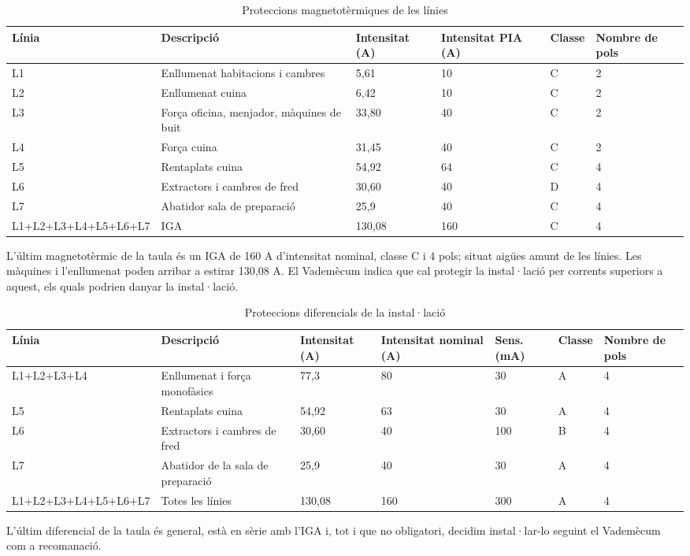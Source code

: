 \begin{table}[H]
\small
\begin{center}
 \begin{tabu} to \textwidth {|X[3, l]|X[2, l]|X[r]|X[r]|X[r]|X[r]|}%
 \hline
 Línia & Descripció & Intensitat (A) & Intensitat PIA (A) & Classe & Nombre de pols \\
 \hline \hline 
L1 & Enllumenat habitacions i cambres & 5,61 & 10 & C & 2 \\ \hline
L2 & Enllumenat cuina & 6,42 & 10 & C & 2 \\ \hline
L3 & Força oficina, menjador, màquines de buit & 33,80 & 40 & C & 2 \\ \hline
L4 & Força cuina & 31,45 & 40 & C & 2 \\ \hline
L5 & Rentaplats cuina & 54,92 & 64 & C & 4 \\ \hline
L6 & Extractors i cambres de fred & 30,60 & 40 & D & 4 \\ \hline
L7 & Abatidor sala de preparació & 25,9 & 40 & C & 4 \\ \hline \hline
L1+L2+L3+L4+L5+L6+L7 & IGA & 130,08 & 160 & C & 4 \\ \hline

 \end{tabu}
 \caption{Proteccions magnetotèrmiques de les línies}
\end{center}
\end{table}
\noindent L'últim magnetotèrmic de la taula és un IGA de 160 A d'intensitat nominal, classe C i 4 pols; situat aigües amunt de les línies. Les màquines i l'enllumenat poden arribar a estirar 130,08 A. El Vademècum indica que cal protegir la instal·lació per corrents superiors a aquest, els quals podrien danyar la instal·lació.


\begin{table}[H]
\small
\begin{center}
 \begin{tabu} to \textwidth {|X[3, l]|X[2, l]|X[r]|X[r]|X[1,r]|X[1,r]|X[r]|}%
 \hline
 Línia & Descripció & Intensitat (A) & Intensitat nominal (A) & Sens. (mA) & Classe & Nombre de pols \\
 \hline \hline 
L1+L2+L3+L4 & Enllumenat i força monofàsics & 77,3 & 80 & 30 & A & 4 \\ \hline
L5 & Rentaplats cuina & 54,92 & 63 & 30 & A & 4 \\ \hline
L6 & Extractors i cambres de fred & 30,60 & 40 & 100 & B & 4 \\ \hline
L7 & Abatidor de la sala de preparació & 25,9 & 40 & 30 & A & 4 \\ \hline \hline
L1+L2+L3+L4+L5+L6+L7 & Totes les línies & 130,08 & 160 & 300 & A & 4 \\ \hline
 \end{tabu}
 \caption{Proteccions diferencials de la instal·lació}
\end{center}
\end{table}
\noindent L'últim diferencial de la taula és general, està en sèrie amb l'IGA i, tot i que no obligatori, decidim instal·lar-lo seguint el Vademècum com a recomanació.




\clearpage
